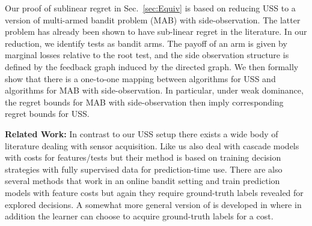 Our proof of sublinear regret in Sec.~\ref{sec:Equiv} is based on reducing USS to a version of multi-armed bandit problem (MAB) with side-observation. The latter problem has already been shown to have sub-linear regret in the literature. In our reduction, we identify tests as bandit arms. %
The payoff of an arm is given by marginal losses relative to the root test, and the side observation structure is defined by the feedback graph induced by the directed graph. We then formally show that there is a one-to-one mapping between algorithms for USS and algorithms for MAB with side-observation. In particular, under weak dominance, the regret bounds for MAB with side-observation then imply corresponding regret bounds for USS.

\noindent
{\bf Related Work:}
%
%
In contrast to our USS setup there exists a wide body of literature dealing with sensor acquisition. Like us \cite{AISTATS13_SupervisedSequentialLearning_TrapezSaligram,NIPS2015_DirectedAcyclic_WangTrapezSaligram} also deal with cascade models with costs for features/tests but their method is based on training decision strategies with fully supervised data for prediction-time use. There are also several methods that work in an online bandit setting and train prediction models with feature costs \cite{SBCA14:BanditsPaid} but again they require ground-truth labels revealed for explored decisions. A somewhat more general version of \cite{SBCA14:BanditsPaid} is developed in \cite{ZBGGySz13:CostlyFeatures} where in addition the learner can choose to acquire ground-truth labels for a cost.

%

